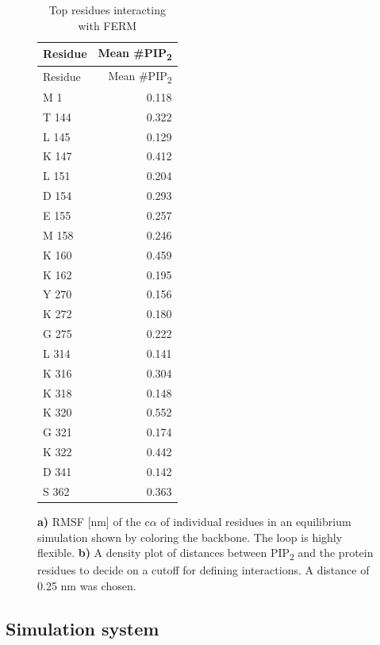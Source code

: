 \documentclass[
  letterpaper,
  DIV=11,
  numbers=noendperiod]{scrartcl}
\begin{document}
\begin{figure}
\begin{minipage}[t]{0.33\linewidth}
{\begin{longtable}[]{@{}lr@{}}
\caption{\label{tbl-ferm-top-interacting}Top residues interacting with
FERM}\tabularnewline
\toprule
Residue & Mean \#PIP\textsubscript{2} \\
\midrule
\endfirsthead
\toprule
Residue & Mean \#PIP\textsubscript{2} \\
\midrule
\endhead
M 1 & 0.118 \\
T 144 & 0.322 \\
L 145 & 0.129 \\
K 147 & 0.412 \\
L 151 & 0.204 \\
D 154 & 0.293 \\
E 155 & 0.257 \\
M 158 & 0.246 \\
K 160 & 0.459 \\
K 162 & 0.195 \\
Y 270 & 0.156 \\
K 272 & 0.180 \\
G 275 & 0.222 \\
L 314 & 0.141 \\
K 316 & 0.304 \\
K 318 & 0.148 \\
K 320 & 0.552 \\
G 321 & 0.174 \\
K 322 & 0.442 \\
D 341 & 0.142 \\
S 362 & 0.363 \\
\bottomrule
\end{longtable}

}

\end{minipage}%

\caption{\label{fig-suppl}\textbf{a)} RMSF {[}nm{]} of the c\(\alpha\)
of individual residues in an equilibrium simulation shown by coloring
the backbone. The loop is highly flexible. \textbf{b)} A density plot of
distances between PIP\textsubscript{2} and the protein residues to
decide on a cutoff for defining interactions. A distance of 0.25 nm was
chosen.}

\end{figure}

\hypertarget{sec-system}{%
\subsection{Simulation system}\label{sec-system}}
\end{document}
